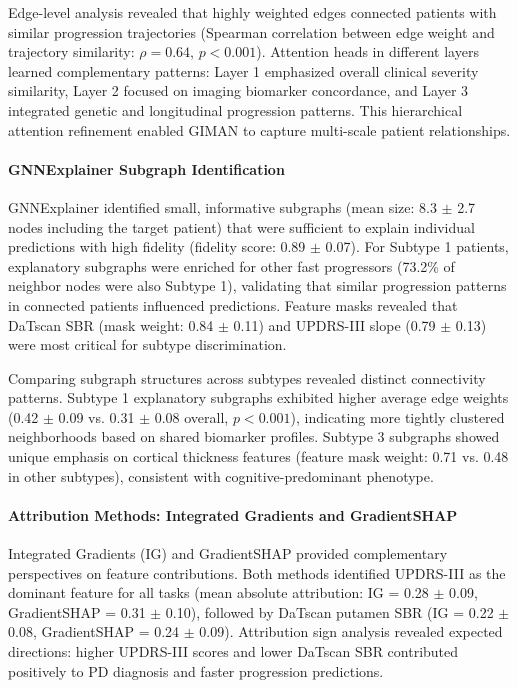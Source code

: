 Edge-level analysis revealed that highly weighted edges connected patients with similar progression trajectories (Spearman correlation between edge weight and trajectory similarity: $\rho = 0.64$, $p < 0.001$). Attention heads in different layers learned complementary patterns: Layer 1 emphasized overall clinical severity similarity, Layer 2 focused on imaging biomarker concordance, and Layer 3 integrated genetic and longitudinal progression patterns. This hierarchical attention refinement enabled GIMAN to capture multi-scale patient relationships.

\paragraph{GNNExplainer Subgraph Identification}
GNNExplainer identified small, informative subgraphs (mean size: 8.3 $\pm$ 2.7 nodes including the target patient) that were sufficient to explain individual predictions with high fidelity (fidelity score: 0.89 $\pm$ 0.07). For Subtype 1 patients, explanatory subgraphs were enriched for other fast progressors (73.2\% of neighbor nodes were also Subtype 1), validating that similar progression patterns in connected patients influenced predictions. Feature masks revealed that DaTscan SBR (mask weight: 0.84 $\pm$ 0.11) and UPDRS-III slope (0.79 $\pm$ 0.13) were most critical for subtype discrimination.

Comparing subgraph structures across subtypes revealed distinct connectivity patterns. Subtype 1 explanatory subgraphs exhibited higher average edge weights (0.42 $\pm$ 0.09 vs. 0.31 $\pm$ 0.08 overall, $p < 0.001$), indicating more tightly clustered neighborhoods based on shared biomarker profiles. Subtype 3 subgraphs showed unique emphasis on cortical thickness features (feature mask weight: 0.71 vs. 0.48 in other subtypes), consistent with cognitive-predominant phenotype.

\paragraph{Attribution Methods: Integrated Gradients and GradientSHAP}
Integrated Gradients (IG) and GradientSHAP provided complementary perspectives on feature contributions. Both methods identified UPDRS-III as the dominant feature for all tasks (mean absolute attribution: IG = 0.28 $\pm$ 0.09, GradientSHAP = 0.31 $\pm$ 0.10), followed by DaTscan putamen SBR (IG = 0.22 $\pm$ 0.08, GradientSHAP = 0.24 $\pm$ 0.09). Attribution sign analysis revealed expected directions: higher UPDRS-III scores and lower DaTscan SBR contributed positively to PD diagnosis and faster progression predictions.


